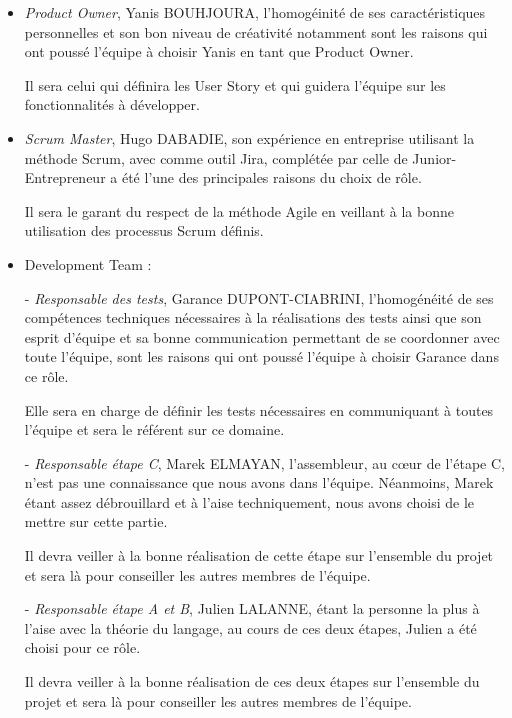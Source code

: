 \documentclass[12pt,a4paper,twoside]{article}
\begin{document}
		\begin{itemize}[label=$\square$]
		
		 \item \textit{Product Owner}, Yanis BOUHJOURA, l'homogéinité de ses caractéristiques personnelles et son bon niveau de créativité notamment sont les raisons qui ont poussé l'équipe à choisir Yanis en tant que Product Owner.
		 
		 Il sera celui qui définira les User Story et qui guidera l'équipe sur les fonctionnalités à développer.
		
		 \item \textit{Scrum Master}, Hugo DABADIE, son expérience en entreprise utilisant la méthode Scrum, avec comme outil Jira, complétée par celle de Junior-Entrepreneur a été l'une des principales raisons du choix de rôle.
		 
		 Il sera le garant du respect de la méthode Agile en veillant à la bonne utilisation des processus Scrum définis.
		
		 \item Development Team :
		 
		 	- \textit{Responsable des tests}, Garance DUPONT-CIABRINI, l'homogénéité de ses compétences techniques nécessaires à la réalisations des tests ainsi que son esprit d'équipe et sa bonne communication permettant de se coordonner avec toute l'équipe, sont les raisons qui ont poussé l'équipe à choisir Garance dans ce rôle.
		 	
		 	Elle sera en charge de définir les tests nécessaires en communiquant à toutes l'équipe et sera le référent sur ce domaine.
		 	
		 	- \textit{Responsable étape C}, Marek ELMAYAN, l'assembleur, au cœur de l'étape C, n'est pas une connaissance que nous avons dans l'équipe. Néanmoins, Marek étant assez débrouillard et à l'aise techniquement, nous avons choisi de le mettre sur cette partie.
		 	
		 	Il devra veiller à la bonne réalisation de cette étape sur l'ensemble du projet et sera là pour conseiller les autres membres de l'équipe.
		 	
		 	- \textit{Responsable étape A et B}, Julien LALANNE, étant la personne la plus à l'aise avec la théorie du langage, au cours de ces deux étapes, Julien a été choisi pour ce rôle.
		 	
		 	Il devra veiller à la bonne réalisation de ces deux étapes sur l'ensemble du projet et sera là pour conseiller les autres membres de l'équipe.
		 	
		 \end{itemize}
		 	
\end{document}
